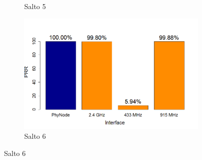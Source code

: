 \documentclass[
	12pt,				%
	openright,			%
	oneside,
	a4paper,			%
	english,			%
	french,				%
	spanish,			%
	brazil				%
	]{abntex2}
\begin{document}
\begin{figure}[tb]
\begin{subfigure}{.5\textwidth}
		\captionsetup{width=.9\textwidth}
		\caption{Salto 5}
		\label{prr_no_opt_s5}
	\end{subfigure}%
	\begin{subfigure}{.5\textwidth}
		\centering
		\includegraphics[width=.98\linewidth]{PRR_Salto6}
		\captionsetup{width=.9\textwidth}
		\caption{Salto 6}
		\label{prr_no_opt_s6}
	\end{subfigure}
\end{figure}
\end{document}
